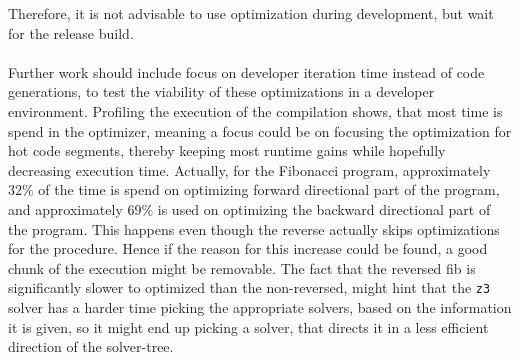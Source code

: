 Therefore, it is not advisable to use optimization during development, but wait for the
release build.
\\
\\
Further work should include focus on developer iteration time instead of code generations,
to test the viability of these optimizations in a developer environment. Profiling the execution
of the compilation shows, that most time is spend in the optimizer, meaning a focus could be
on focusing the optimization for hot code segments, thereby keeping most runtime gains while
hopefully decreasing execution time. Actually, for the Fibonacci program, approximately
$32\%$ of the time is spend on optimizing forward directional part of the program, and
approximately $69\%$ is used on optimizing the backward directional part of the program.
This happens even though the reverse actually skips optimizations for the 
procedure. Hence if the reason for this increase could be found, a good chunk of the
execution might be removable. The fact that the reversed fib is significantly slower
to optimized than the non-reversed, might hint that the \texttt{z3} solver has a harder
time picking the appropriate solvers, based on the information it is given, so it might
end up picking a solver, that directs it in a less efficient direction of the solver-tree.

